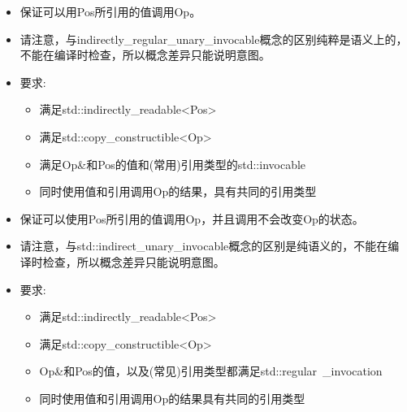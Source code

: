 

\begin{itemize}
\item
保证可以用Pos所引用的值调用Op。

\item
请注意，与indirectly\_regular\_unary\_invocable概念的区别纯粹是语义上的，不能在编译时检查，所以概念差异只能说明意图。

\item
要求:
\begin{itemize}
\item
满足std::indirectly\_readable<Pos>

\item
满足std::copy\_constructible<Op>

\item
满足Op\&和Pos的值和(常用)引用类型的std::invocable

\item
同时使用值和引用调用Op的结果，具有共同的引用类型
\end{itemize}
\end{itemize}


\begin{itemize}
\item
保证可以使用Pos所引用的值调用Op，并且调用不会改变Op的状态。

\item
请注意，与std::indirect\_unary\_invocable概念的区别是纯语义的，不能在编译时检查，所以概念差异只能说明意图。

\item
要求:
\begin{itemize}
\item
满足std::indirectly\_readable<Pos>

\item
满足std::copy\_constructible<Op>

\item
Op\&和Pos的值，以及(常见)引用类型都满足std::regular\ _invocation

\item
同时使用值和引用调用Op的结果具有共同的引用类型
\end{itemize}
\end{itemize}


